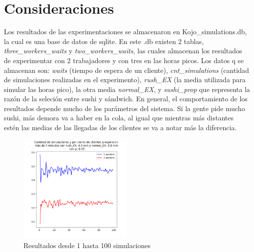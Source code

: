 \documentclass[11pt]{article}
\begin{document}
\section{Consideraciones}
Los resultados de las experimentaciones se almacenaron en Kojo\_simulations.db, la cual es una base de datos de sqlite. En este .db existen 2 tablas, \emph{three\_workers\_waits} y \emph{two\_workers\_waits}, las cuales almacenan los resultados de experimentar con 2 trabajadores y con tres en las horas picos. Los datos q se almacenan son: \emph{waits} (tiempo de espera de un cliente), \emph{cnt\_simulations} (cantidad de simulaciones realizadas en el experimento), \emph{rush\_EX} (la media utilizada para simular las horas pico), la otra media \emph{normal\_EX}, y \emph{sushi\_prop} que representa la raz\'on de la seleci\'on entre sushi y s\'andwich. 
En general, el comportamiento de los resultados depende mucho de los par\'ametros del sistema. Si la gente pide mucho sushi, m\'as demora va a haber en la cola, al igual que mientras m\'as distantes est\'en las medias de las llegadas de los clientes se va a notar m\'as la diferencia.
\begin{figure}	
	\begin{center}
		\includegraphics[width=0.5\textwidth]{index}
		\caption{Resultados desde 1 hasta 100 simulaciones}
	\end{center}
\end{figure}
\end{document}

